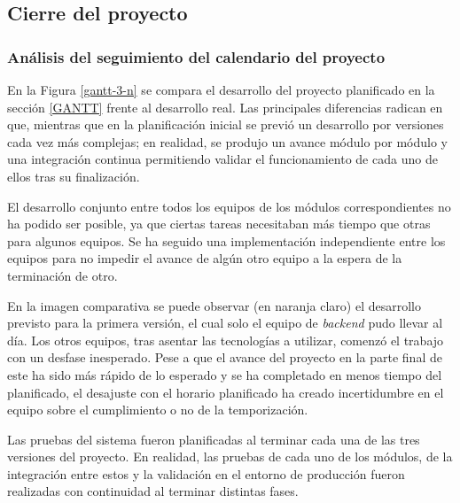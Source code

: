 \documentclass{article}
\begin{document}
\subsection{Cierre del proyecto}

\subsubsection*{Análisis del seguimiento del calendario del proyecto}

En la Figura \ref{gantt-3-n} se compara el desarrollo del proyecto planificado en la sección \ref{GANTT} frente al desarrollo real. Las principales diferencias radican en que, mientras que en la planificación inicial se previó un desarrollo por versiones cada vez más complejas; en realidad, se produjo un avance módulo por módulo y una integración continua permitiendo validar el funcionamiento de cada uno de ellos tras su finalización.

El desarrollo conjunto entre todos los equipos de los módulos correspondientes no ha podido ser posible, ya que ciertas tareas necesitaban más tiempo que otras para algunos equipos. Se ha seguido una implementación independiente entre los equipos para no impedir el avance de algún otro equipo a la espera de la terminación de otro.

En la imagen comparativa se puede observar (en naranja claro) el desarrollo previsto para la primera versión, el cual solo el equipo de \textit{backend} pudo llevar al día. Los otros equipos, tras asentar las tecnologías a utilizar, comenzó el trabajo con un desfase inesperado. Pese a que el avance del proyecto en la parte final de este ha sido más rápido de lo esperado y se ha completado en menos tiempo del planificado, el desajuste con el horario planificado ha creado incertidumbre en el equipo sobre el cumplimiento o no de la temporización.

Las pruebas del sistema fueron planificadas al terminar cada una de las tres versiones del proyecto. En realidad, las pruebas de cada uno de los módulos, de la integración entre estos y la validación en el entorno de producción fueron realizadas con continuidad al terminar distintas fases.
\end{document}

